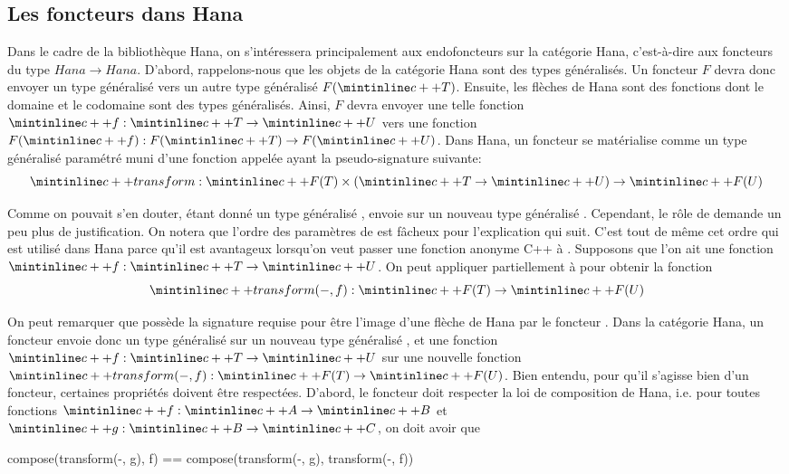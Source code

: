 \subsection{Les foncteurs dans Hana}
Dans le cadre de la bibliothèque Hana, on s'intéressera principalement aux
endofoncteurs sur la catégorie Hana, c'est-à-dire aux foncteurs du type
$Hana \to Hana$. D'abord, rappelons-nous que les objets de la catégorie
Hana sont des types généralisés. Un foncteur $F$ devra donc envoyer un type
généralisé  vers un autre type généralisé $F(\cc{T})$. Ensuite, les
flèches de Hana sont des fonctions dont le domaine et le codomaine sont des
types généralisés. Ainsi, $F$ devra envoyer une telle fonction
$\cc{f} : \cc{T} \to \cc{U}$ vers une fonction $F(\cc{f}) : F(\cc{T}) \to F(\cc{U})$.
Dans Hana, un foncteur se matérialise comme un type généralisé paramétré muni
d'une fonction appelée  ayant la pseudo-signature suivante:
\[
    \cc{transform} : \cc{F(T)} \times (\cc{T} \to \cc{U}) \to \cc{F(U)}
\]

Comme on pouvait s'en douter, étant donné un type généralisé , 
envoie  sur un nouveau type généralisé . Cependant, le rôle de
 demande un peu plus de justification. On notera que l'ordre des
paramètres de  est fâcheux pour l'explication qui suit. C'est
tout de même cet ordre qui est utilisé dans Hana parce qu'il est avantageux
lorsqu'on veut passer une fonction anonyme C++ à . Supposons que
l'on ait une fonction $\cc{f} : \cc{T} \to \cc{U}$. On peut appliquer partiellement
 à  pour obtenir la fonction
\[
    \cc{transform(-, f)} : \cc{F(T)} \to \cc{F(U)}
\]

On peut remarquer que  possède la signature requise
pour être l'image d'une flèche de Hana par le foncteur . Dans la catégorie
Hana, un foncteur  envoie donc un type généralisé  sur un nouveau
type généralisé , et une fonction $\cc{f} : \cc{T} \to \cc{U}$ sur une
nouvelle fonction $\cc{transform(-, f)} : \cc{F(T)} \to \cc{F(U)}$. Bien entendu,
pour qu'il s'agisse bien d'un foncteur, certaines propriétés doivent être
respectées. D'abord, le foncteur doit respecter la loi de composition de Hana,
i.e. pour toutes fonctions $\cc{f} : \cc{A} \to \cc{B}$ et $\cc{g} : \cc{B} \to \cc{C}$,
on doit avoir que
\begin{cpp}
    compose(transform(-, g), f) == compose(transform(-, g), transform(-, f))
\end{cpp}

